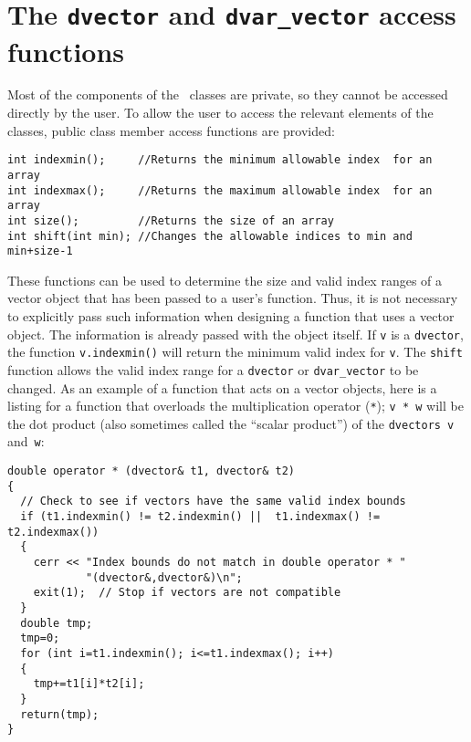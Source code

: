 \documentclass{admbmanual}
\begin{document}
\section{The \texttt{dvector} and \texttt{dvar\_vector} access functions}

Most of the components of the \scAD\ classes are private, so they cannot be
accessed directly by the user. To allow the user to access the relevant elements
of the classes, public class member access functions are provided:
\begin{lstlisting}
int indexmin();     //Returns the minimum allowable index  for an array
int indexmax();     //Returns the maximum allowable index  for an array
int size();         //Returns the size of an array
int shift(int min); //Changes the allowable indices to min and min+size-1
\end{lstlisting}

These functions can be used to determine the size and valid index ranges of a
vector object that has been passed to a user's function. Thus, it is not
necessary to explicitly pass such information when designing a function that
uses a vector object. The information is already passed with the object itself.
If \texttt{v} is a \texttt{dvector}, the function \texttt{v.indexmin()} will
return the minimum valid index for \texttt{v}. The \texttt{shift} function
allows the valid index range for a \texttt{dvector} or \texttt{dvar\_vector} to
be changed. As an example of a function that acts on a vector objects, here is a
listing for a function that overloads the multiplication operator (\texttt{*});
\texttt{v * w} will be the dot product (also sometimes called the ``scalar
product'') of the \texttt{dvectors}~\texttt{v} and~\texttt{w}:
\begin{lstlisting}
double operator * (dvector& t1, dvector& t2)
{
  // Check to see if vectors have the same valid index bounds
  if (t1.indexmin() != t2.indexmin() ||  t1.indexmax() != t2.indexmax())
  {
    cerr << "Index bounds do not match in double operator * "
            "(dvector&,dvector&)\n";
    exit(1);  // Stop if vectors are not compatible
  }
  double tmp;
  tmp=0;
  for (int i=t1.indexmin(); i<=t1.indexmax(); i++)
  {
    tmp+=t1[i]*t2[i];
  }
  return(tmp);
}
\end{lstlisting}
\end{document}
